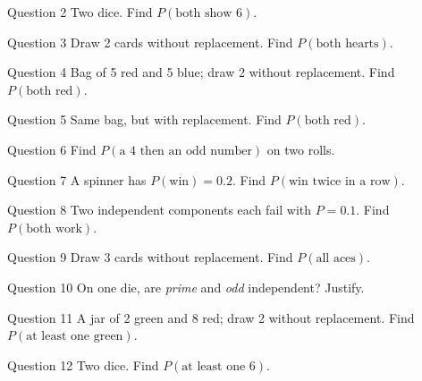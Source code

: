 \documentclass[11pt]{article}
\begin{document}
\begin{qbox}{Question 2}
Two dice. Find $P(\text{both show 6})$.\workspace{2.4cm}
\end{qbox}

\begin{qbox}{Question 3}
Draw 2 cards without replacement. Find $P(\text{both hearts})$.\workspace{2.4cm}
\end{qbox}

\begin{qbox}{Question 4}
Bag of 5 red and 5 blue; draw 2 without replacement. Find $P(\text{both red})$.\workspace{2.4cm}
\end{qbox}

\begin{qbox}{Question 5}
Same bag, but with replacement. Find $P(\text{both red})$.\workspace{2.4cm}
\end{qbox}

\begin{qbox}{Question 6}
Find $P(\text{a 4 then an odd number})$ on two rolls.\workspace{2.4cm}
\end{qbox}

\begin{qbox}{Question 7}
A spinner has $P(\text{win})=0.2$. Find $P(\text{win twice in a row})$.\workspace{2.4cm}
\end{qbox}

\begin{qbox}{Question 8}
Two independent components each fail with $P=0.1$. Find $P(\text{both work})$.\workspace{2.4cm}
\end{qbox}

\begin{qbox}{Question 9}
Draw 3 cards without replacement. Find $P(\text{all aces})$.\workspace{2.4cm}
\end{qbox}

\begin{qbox}{Question 10}
On one die, are \emph{prime} and \emph{odd} independent? Justify.\workspace{2.4cm}
\end{qbox}

\begin{qbox}{Question 11}
A jar of 2 green and 8 red; draw 2 without replacement. Find $P(\text{at least one green})$.\workspace{2.4cm}
\end{qbox}

\begin{qbox}{Question 12}
Two dice. Find $P(\text{at least one 6})$.\workspace{2.4cm}
\end{qbox}
\end{document}
